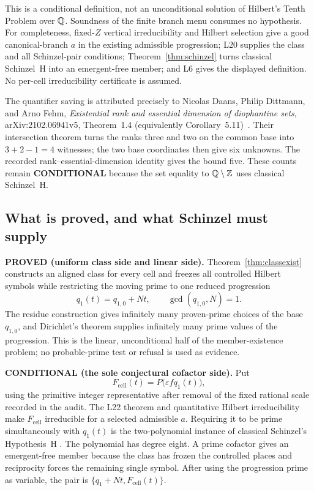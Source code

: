 This is a conditional definition, not an unconditional solution of
Hilbert's Tenth Problem over $\mathbb{Q}$.  Soundness of the finite branch menu
consumes no hypothesis.  For completeness, fixed-$Z$ vertical
irreducibility and Hilbert selection give a good canonical-branch $a$ in
the existing admissible progression; L20 supplies the class and all
Schinzel-pair conditions; Theorem~\ref{thm:schinzel} turns classical
Schinzel~H into an emergent-free member; and L6 gives the displayed
definition.  No per-cell irreducibility certificate is assumed.

The quantifier saving is attributed precisely to Nicolas Daans, Philip
Dittmann, and Arno Fehm, \emph{Existential rank and essential dimension of
diophantine sets}, arXiv:2102.06941v5, Theorem~1.4 (equivalently
Corollary~5.11)~\cite{ddf}.  Their intersection theorem turns the ranks
three and two on the common base into $3+2-1=4$ witnesses; the two base
coordinates then give six unknowns.  The recorded rank--essential-dimension
identity gives the bound five.  These counts remain \textbf{CONDITIONAL}
because the set equality to $\mathbb{Q}\setminus\mathbb{Z}$ uses classical Schinzel~H.

\subsection{What is proved, and what Schinzel must supply}

\textbf{PROVED (uniform class side and linear side).}
Theorem~\ref{thm:classexist} constructs an aligned class for every cell and
freezes all controlled Hilbert symbols while restricting the moving prime to
one reduced progression
\[
 q_1(t)=q_{1,0}+Nt,\qquad \gcd(q_{1,0},N)=1.
\]
The residue construction gives infinitely many proven-prime choices of the
base $q_{1,0}$, and Dirichlet's theorem supplies infinitely many prime values
of the progression.  This is the linear, unconditional half of the
member-existence problem; no probable-prime test or refusal is used as
evidence.

\textbf{CONDITIONAL (the sole conjectural cofactor side).}  Put
\[
 F_{\mathrm{cell}}(t)=P\bigl(\varepsilon f q_1(t)\bigr),
\]
using the primitive integer representative after removal of the fixed
rational scale recorded in the audit.  The L22 theorem and quantitative
Hilbert irreducibility make $F_{\mathrm{cell}}$ irreducible for a selected
admissible $a$.  Requiring it to be prime simultaneously with
$q_1(t)$ is the two-polynomial instance of classical Schinzel's
Hypothesis~H \cite{schinzel}.  The polynomial has degree eight.  A prime
cofactor gives an emergent-free member because the class has frozen the
controlled places and reciprocity forces the remaining single symbol.
After using the progression prime as variable, the pair is
$\{q_1+Nt,F_{\mathrm{cell}}(t)\}$.

